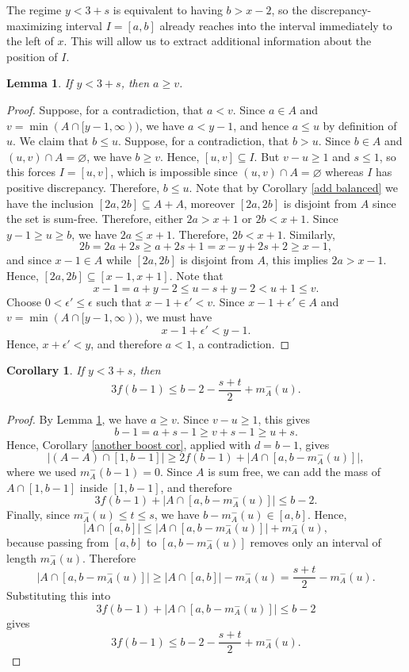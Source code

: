 \documentclass[11pt,reqno]{amsart}
\newtheorem{lem}[thm]{Lemma}
\newtheorem{cor}[thm]{Corollary}
\theoremstyle{definition}
\def\F#1{f(#1)}
\begin{document}
The regime $y<3+s$ is equivalent to having $b>x-2$, so the discrepancy-maximizing interval $I=[a,b]$ already reaches into the interval immediately to the left of $x$. This will allow us to extract additional information about the position of $I$.
\begin{lem}
\label{small case} If $y<3+s$, then $a\geq v$. 
\end{lem}
\begin{proof}
Suppose, for a contradiction, that $a<v$. Since $a\in A$ and $v=\min(A\cap[y-1,\infty))$, we have $a<y-1$, and hence $a\leq u$ by definition of $u$. We claim that $b\leq u$. Suppose, for a contradiction, that $b>u$. Since $b\in A$ and $(u,v)\cap A=\varnothing$, we have $b\geq v$. Hence,   $[u,v]\subseteq I$. But $v-u\geq1$ and $s\leq1$, so this forces $I=[u,v]$, which is impossible since $(u,v)\cap A=\varnothing$ whereas $I$ has positive discrepancy. Therefore,   $b\leq u$. Note that by Corollary \ref{add balanced} we have the inclusion $[2a, 2b]\subseteq A + A$, moreover $[2a,2b]$ is disjoint from $A$ since the set is sum-free.
Therefore, either $2a > x + 1$ or $2b < x + 1$. Since $y - 1\geq u \geq b$, we have $2a \leq x + 1$. Therefore, $2b < x + 1$. Similarly, 
\begin{equation*}
    2b = 2a + 2s\geq a + 2s + 1 = x - y + 2s + 2\geq x - 1,
\end{equation*}
and since $x-1\in A$ while $[2a,2b]$ is disjoint from $A$, this implies $2a > x - 1$. Hence,   $[2a, 2b]\subseteq [x - 1, x + 1]$.
Note that
$$
    x-1=a+y-2\leq u-s+y-2<u+1\leq v.
$$
Choose $0<\epsilon'\leq\epsilon$ such that $x-1+\epsilon'<v$. Since
$x-1+\epsilon'\in A$ and $v=\min(A\cap[y-1,\infty))$, we must have
$$
    x-1+\epsilon'<y-1.
$$
Hence, $x+\epsilon'<y$, and therefore $a<1$, a contradiction.
\end{proof}

\begin{cor}
    If $y < 3 + s$, then
    $$
        3\F{b - 1}\leq b - 2 - \frac{s + t}{2} + m_A^-(u).
    $$
\end{cor}
\begin{proof}
     By Lemma \ref{small case}, we have $a\geq v$. Since $v-u\geq 1$, this gives
    $$
        b-1=a+s-1\geq v+s-1\geq u+s.
    $$
    Hence, Corollary \ref{another boost cor}, applied with $d=b-1$, gives
    $$
        |(A-A)\cap[1,b-1]|
        \geq
        2\F{b-1}+|A\cap[a,b-m_A^-(u)]|,
    $$
    where we used $m_A^-(b-1)=0$. Since $A$ is sum free, we can add the mass of $A\cap[1,b-1]$ inside $[1,b-1]$, and therefore
    $$
        3\F{b-1}+|A\cap[a,b-m_A^-(u)]|\leq b-2.
    $$
    Finally, since $m_A^-(u)\leq t\leq s$, we have $b-m_A^-(u)\in[a,b]$. Hence,  
$$
    |A\cap[a,b]|
    \leq
    |A\cap[a,b-m_A^-(u)]|+m_A^-(u),
$$
because passing from $[a,b]$ to $[a,b-m_A^-(u)]$ removes only an interval of length $m_A^-(u)$. Therefore
$$
    |A\cap[a,b-m_A^-(u)]|
    \geq
    |A\cap[a,b]|-m_A^-(u)
    =
    \frac{s+t}{2}-m_A^-(u).
$$
Substituting this into
$$
    3\F{b-1}+|A\cap[a,b-m_A^-(u)]|\leq b-2
$$
gives
$$
    3\F{b-1}
    \leq
    b-2-\frac{s+t}{2}+m_A^-(u).
$$
\end{proof}
\end{document}
